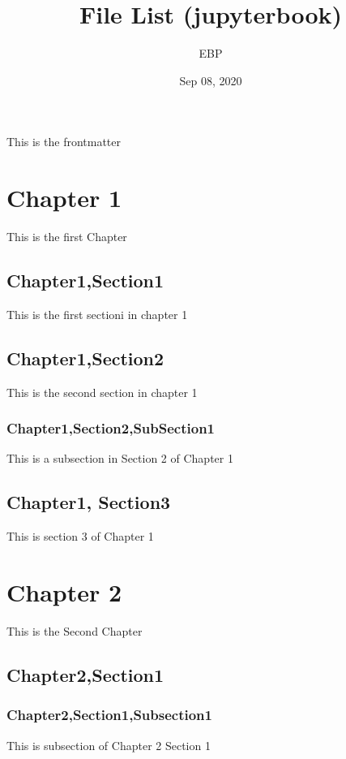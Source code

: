 \documentclass[letterpaper,10pt,english]{sphinxmanual}
\title{File List (jupyterbook)}
\date{Sep 08, 2020}
\author{EBP}
\begin{document}
\pagestyle{empty}
\sphinxmaketitle
\pagestyle{plain}
\sphinxtableofcontents
\pagestyle{normal}
\label{\detokenize{intro::doc}}


This is the frontmatter


\chapter{Chapter 1}
\label{\detokenize{chapter1:chapter-1}}\label{\detokenize{chapter1::doc}}
This is the first Chapter


\section{Chapter1,Section1}
\label{\detokenize{chapter1:chapter1-section1}}
This is the first sectioni in chapter 1


\section{Chapter1,Section2}
\label{\detokenize{chapter1:chapter1-section2}}
This is the second section in chapter 1


\subsection{Chapter1,Section2,SubSection1}
\label{\detokenize{chapter1:chapter1-section2-subsection1}}
This is a subsection in Section 2 of Chapter 1


\section{Chapter1, Section3}
\label{\detokenize{chapter1:chapter1-section3}}
This is section 3 of Chapter 1


\chapter{Chapter 2}
\label{\detokenize{chapter2:chapter-2}}\label{\detokenize{chapter2::doc}}
This is the Second Chapter


\section{Chapter2,Section1}
\label{\detokenize{chapter2:chapter2-section1}}

\subsection{Chapter2,Section1,Subsection1}
\label{\detokenize{chapter2:chapter2-section1-subsection1}}
This is subsection of Chapter 2 Section 1
\end{document}
